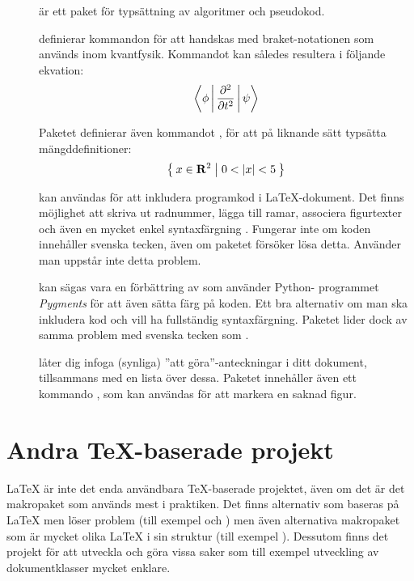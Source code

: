 \documentclass[10pt,../../a4.tex]{subfiles}
\begin{document}
\begin{description}
	\item[]
	är ett paket för typsättning av algoritmer och pseudokod.
	
	\item[{}]\label{pack:braket}
	definierar kommandon för att handskas med braket-notationen som
	används inom kvantfysik. Kommandot  kan således resultera
	i följande ekvation:
	\begin{equation*}
		\Braket{\phi|\dfrac{\partial^2}{\partial t^2}|\psi}
	\end{equation*}
	
	Paketet definierar även kommandot , för att på liknande
	sätt typsätta mängddefinitioner:
	\begin{equation*}
		\Set{x\in\mathbf{R}^2|0<{|x|}<5}
	\end{equation*}
	
	\item[]
	kan användas för att inkludera programkod i \LaTeX-dokument. Det finns
	möjlighet att skriva ut radnummer, lägga till ramar, associera
	figurtexter och även en mycket enkel syntaxfärgning . Fungerar inte om koden innehåller svenska tecken, även
	om paketet \emph{} försöker lösa detta. Använder 
	man \XeTeX uppstår inte detta problem.
	
	\item[{}]
	kan sägas vara en förbättring av  som använder Python-%
	programmet \emph{Pygments} för att även sätta färg på koden. Ett bra
	alternativ om man ska inkludera kod och vill ha fullständig
	syntaxfärgning. Paketet lider dock av samma problem med svenska tecken
	som .
	
	\item[{}]
	låter dig infoga (synliga) ”att göra”-anteckningar i ditt dokument, tillsammans
	med en lista över dessa. Paketet innehåller även ett kommando ,
	som kan användas för att markera en saknad figur.
\end{description}

\section{Andra \TeX-baserade projekt}
\LaTeX{} är inte det enda användbara \TeX-baserade projektet, även om det
är det makropaket som används mest i praktiken. Det finns alternativ
som baseras på \LaTeX{} men löser problem (till exempel \XeTeX och
) men även alternativa makropaket som är mycket olika
\LaTeX{} i sin struktur (till exempel ). Dessutom finns
det projekt för att utveckla \LaTeXe{} och göra vissa saker som till 
exempel utveckling av dokumentklasser mycket enklare.
\end{document}
